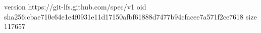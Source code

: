 version https://git-lfs.github.com/spec/v1
oid sha256:cbae710c64e1e4f0931e11d17150afbf61888d7477b94cfacee7a571f2ce7618
size 117657

